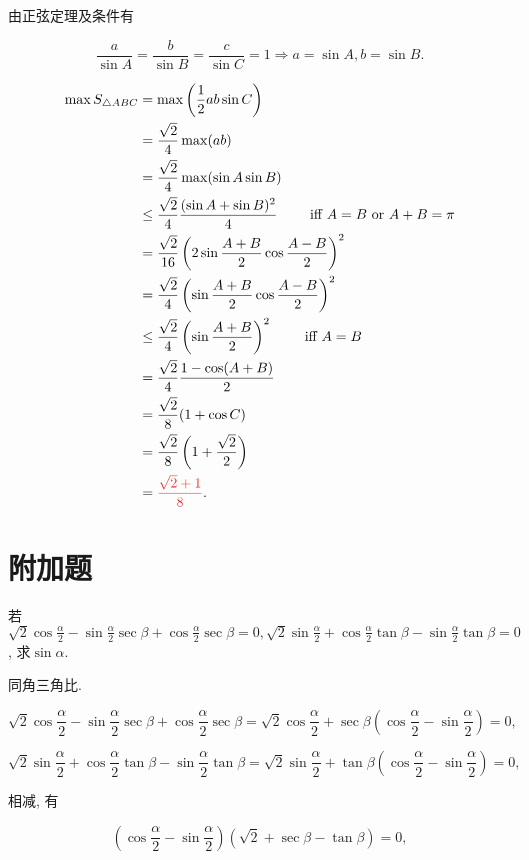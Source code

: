\documentclass[8pt]{article}
\begin{document}
			由正弦定理及条件有

			$$\frac{a}{\sin A}=\frac{b}{\sin B}=\frac{c}{\sin C}=1 \Rightarrow a=\sin A, b=\sin B.$$

			\begin{align*}
				\max S_{\triangle ABC} &= \max \left(\frac{1}{2} ab\sin C\right)\\
				&= \frac{\sqrt{2}}{4} \max (ab)\\
				&= \frac{\sqrt{2}}{4} \max (\sin A \sin B)\\
				&\leq \frac{\sqrt{2}}{4} \frac{(\sin A + \sin B)^2}{4} \tag*{$\Iff A=B \lgor A+B=\pi$}\\
				&= \frac{\sqrt{2}}{16} \left(2 \sin \frac{A+B}{2} \cos \frac{A-B}{2}\right)^2\\
				&= \frac{\sqrt{2}}{4} \left(\sin \frac{A+B}{2} \cos \frac{A-B}{2}\right)^2\\
				&\leq \frac{\sqrt{2}}{4} \left(\sin \frac{A+B}{2}\right)^2 \tag*{$\Iff A=B$}\\
				&= \frac{\sqrt{2}}{4} \frac{1-\cos(A+B)}{2}\\
				&= \frac{\sqrt{2}}{8} (1+\cos C)\\
				&= \frac{\sqrt{2}}{8} \left(1 + \frac{\sqrt{2}}{2}\right)\\
				&= \ansmath{\frac{\sqrt{2} + 1}{8}}.
			\end{align*}

	\section{附加题}
		若$\displaystyle \sqrt{2} \cos \frac{\alpha}{2} - \sin \frac{\alpha}{2} \sec \beta + \cos \frac{\alpha}{2} \sec \beta = 0, \sqrt{2} \sin \frac{\alpha}{2} + \cos \frac{\alpha}{2} \tan \beta - \sin \frac{\alpha}{2} \tan \beta = 0$, 求$\sin \alpha$.

		同角三角比.

			$$\sqrt{2} \cos \frac{\alpha}{2} - \sin \frac{\alpha}{2} \sec \beta + \cos \frac{\alpha}{2} \sec \beta = \sqrt{2} \cos \frac{\alpha}{2} + \sec \beta \left(\cos \frac{\alpha}{2} - \sin \frac{\alpha}{2}\right)=0,$$

			$$\sqrt{2} \sin \frac{\alpha}{2} + \cos \frac{\alpha}{2} \tan \beta - \sin \frac{\alpha}{2} \tan \beta = \sqrt{2} \sin \frac{\alpha}{2} + \tan \beta \left(\cos \frac{\alpha}{2} - \sin \frac{\alpha}{2}\right)=0,$$

			相减, 有

			$$\left(\cos \frac{\alpha}{2} - \sin \frac{\alpha}{2}\right)\left(\sqrt{2} + \sec \beta - \tan \beta\right) = 0,$$
\end{document}
